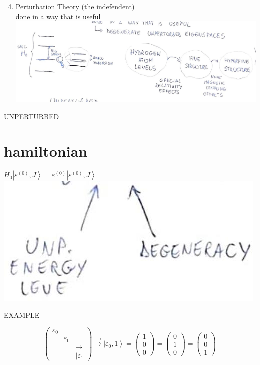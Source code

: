 \documentclass[10pt]{article}
\begin{document}
\begin{enumerate}
  \setcounter{enumi}{3}
  \item Perturbation Theory (the indefendent)\\
done in a way that is useful\\
\includegraphics[max width=\textwidth, center]{2025_10_16_f6b2ddb567eefef2c7a2g-1(1)}
\end{enumerate}

UNPERTURBED

\section*{hamiltonian}
$H_{0}\left|\varepsilon^{(0)}, J\right\rangle=\varepsilon^{(0)}\left|\varepsilon^{(0)}, J\right\rangle$\\
\includegraphics[max width=\textwidth, center]{2025_10_16_f6b2ddb567eefef2c7a2g-1}

EXAMPLE

$$
\left(\begin{array}{rll}
\varepsilon_{0} & & \\
& \varepsilon_{0} & \\
& & \rightarrow \\
& & \mid \varepsilon_{1}
\end{array}\right) \xrightarrow{\rightarrow}\left|\varepsilon_{0}, 1\right\rangle=\left(\begin{array}{l}
1 \\
0 \\
0
\end{array}\right)=\left(\begin{array}{l}
0 \\
1 \\
0
\end{array}\right)=\left(\begin{array}{l}
0 \\
0 \\
1
\end{array}\right)
$$
\end{document}
